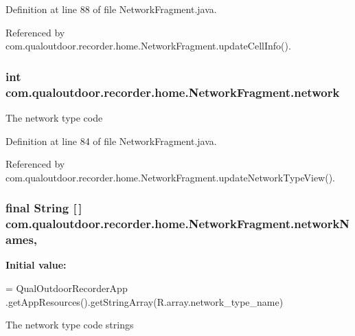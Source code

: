 Definition at line 88 of file Network\-Fragment.\-java.



Referenced by com.\-qualoutdoor.\-recorder.\-home.\-Network\-Fragment.\-update\-Cell\-Info().

\hypertarget{classcom_1_1qualoutdoor_1_1recorder_1_1home_1_1NetworkFragment_a77658d6cfaaf2f11c93f8b018b3ccacf}{
\subsubsection[{network}]{\setlength{\rightskip}{0pt plus 5cm}int com.\-qualoutdoor.\-recorder.\-home.\-Network\-Fragment.\-network\hspace{0.3cm}{\ttfamily [private]}}}\label{classcom_1_1qualoutdoor_1_1recorder_1_1home_1_1NetworkFragment_a77658d6cfaaf2f11c93f8b018b3ccacf}
The network type code 

Definition at line 84 of file Network\-Fragment.\-java.



Referenced by com.\-qualoutdoor.\-recorder.\-home.\-Network\-Fragment.\-update\-Network\-Type\-View().

\hypertarget{classcom_1_1qualoutdoor_1_1recorder_1_1home_1_1NetworkFragment_ab3a1096763f8a71e34641f21e90cd715}{
\subsubsection[{network\-Names}]{\setlength{\rightskip}{0pt plus 5cm}final String \mbox{[}$\,$\mbox{]} com.\-qualoutdoor.\-recorder.\-home.\-Network\-Fragment.\-network\-Names\hspace{0.3cm}{\ttfamily [static]}, {\ttfamily [private]}}}\label{classcom_1_1qualoutdoor_1_1recorder_1_1home_1_1NetworkFragment_ab3a1096763f8a71e34641f21e90cd715}
{\bfseries Initial value\-:}
\begin{DoxyCode}
= QualOutdoorRecorderApp
            .getAppResources().getStringArray(R.array.network\_type\_name)
\end{DoxyCode}
The network type code strings 

